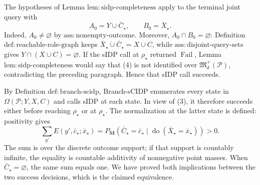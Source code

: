 The hypotheses of Lemma \(\mathrm{lem{:}sidp\text{-}completeness}\) apply to the terminal joint query with
\[
 A_0=Y\cup\bar C_\star,
 \qquad B_0=\bar X_\star.
\]
Indeed, \(A_0\neq\varnothing\) by \(\mathrm{ass{:}nonempty\text{-}outcome}\).  Moreover, \(A_0\cap B_0=\varnothing\): Definition \(\mathrm{def{:}reachable\text{-}role\text{-}graph}\) keeps \(\bar X_\star\mathbin{\dot\cup}\bar C_\star=X\cup C\), while \(\mathrm{ass{:}disjoint\text{-}query\text{-}sets}\) gives \(Y\cap(X\cup C)=\varnothing\).  If the sIDP call at \(\rho_\star\) returned \(\operatorname{Fail}\), Lemma \(\mathrm{lem{:}sidp\text{-}completeness}\) would say that (4) is not identified over \(\mathfrak M_d^+(\mathcal P)\), contradicting the preceding paragraph.  Hence that sIDP call succeeds.

By Definition \(\mathrm{def{:}branch\text{-}scidp}\), Branch-sCIDP enumerates every state in \(\Omega(\mathcal P;Y,X,C)\) and calls sIDP at each state.  In view of (3), it therefore succeeds either before reaching \(\rho_\star\) or at \(\rho_\star\).  The normalization at the latter state is defined: positivity gives
\[
 \sum_{y'}E(y',\bar c_\star;\bar x_\star)
 =P_{\mathbf M}(\bar C_\star=\bar c_\star
       \mid\operatorname{do}(\bar X_\star=\bar x_\star))>0.
\]
The sum is over the discrete outcome support; if that support is countably infinite, the equality is countable additivity of nonnegative point masses.  When \(\bar C_\star=\varnothing\), the same sum equals one.  We have proved both implications between the two success decisions, which is the claimed equivalence.
